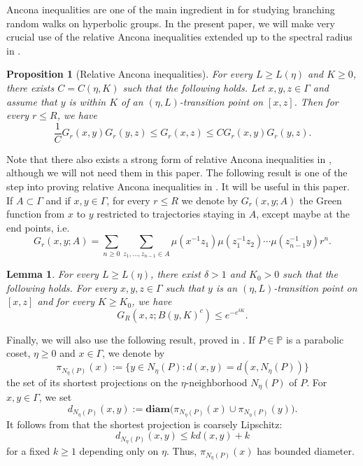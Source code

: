 \documentclass{amsart}
\newtheorem{prop}[thm]{Proposition}
\newtheorem{lem}[thm]{Lemma}
\theoremstyle{definition}
\theoremstyle{remark}
\newcommand{\diam }[1]{{\textbf{diam}\big(#1\big)}}
\begin{document}
Ancona inequalities are one of the main ingredient in \cite{SWX} for studying branching random walks on hyperbolic groups.
In the present paper, we will make very crucial use of the relative Ancona inequalities extended up to the spectral radius in \cite{DG21}.

\begin{prop}[Relative Ancona inequalities]\cite[Theorem~3.6]{DG21}
For every $L\geq L(\eta)$ and $K\geq0$, there exists $C=C(\eta, K)$ such that the following holds.
Let $x,y,z\in \Gamma$ and assume that $y$ is within $K$ of an $(\eta,L)$-transition point on $[x,z]$.
Then for every $r\leq R$, we have
$$\frac{1}{C}G_r(x,y)G_r(y,z)\leq G_r(x,z)\leq C G_r(x,y)G_r(y,z).$$
\end{prop}

Note that there also exists a strong form of relative Ancona inequalities in \cite{DG21}, although we will not need them in this paper.
The following result is one of the step into proving relative Ancona inequalities in \cite{DG21}.
It will be useful in this paper.
If $A\subset \Gamma$ and if $x,y\in \Gamma$, for every $r\leq R$ we denote by $G_r(x,y;A)$ the Green function from $x$ to $y$ restricted to trajectories staying in $A$, except maybe at the end points, i.e.
$$G_r(x,y;A)=\sum_{n\geq 0}\sum_{z_1, \ldots ,z_{n-1}\in A}\mu(x^{-1}z_1)\mu(z_1^{-1}z_2) \cdots \mu(z_{n-1}^{-1}y)r^n.$$

\begin{lem}\label{SupExpDecayLem}\cite[Proposition 3.5]{DG21}
For every $L\geq L(\eta)$, there exist  $\delta>1$ and $K_0>0$   such that the following holds.  
For every $x,y,z\in \Gamma$ such that  $y$ is an $(\eta, L)$-transition point on $[x,z]$ and for every $K\geq K_0$, we have
$$G_R(x,z; B(y,K)^c)\le e^{- e^{\delta K}}.$$
\end{lem}





Finally, we will also use the following result, proved in \cite{DG21}.
If $P\in \mathbb P$ is a parabolic coset, $\eta\geq 0$ and $x\in \Gamma$, we denote by  $$\pi_{N_\eta(P)}(x) :=\{y\in N_\eta(P): d(x,y)=d(x, N_\eta(P))\}$$ the set of its shortest projections on the $\eta$-neighborhood $N_\eta(P)$ of $P$. 
For $x,y\in \Gamma$, we set $$d_{N_\eta(P)}(x,y):=\diam{\pi_{N_\eta(P)}(x)\cup\pi_{N_\eta(P)}(y)}.$$
It follows from \cite[Corollary~8.2]{Hruska} that the shortest projection is coarsely Lipschitz: 
$$d_{N_\eta(P)}(x,y)\le kd(x,y)+k$$ for a fixed $k\ge 1$ depending only on $\eta$. Thus, $\pi_{N_\eta(P)}(x)$ has  bounded diameter.
\end{document}
